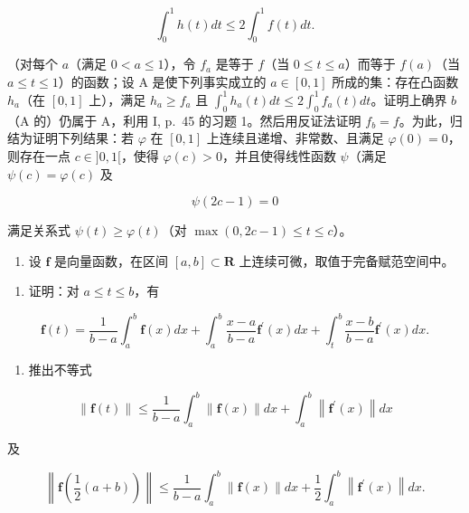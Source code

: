\[
\int_ {0} ^ {1} h (t) d t \leqslant 2 \int_ {0} ^ {1} f (t) d t.
\]

（对每个 \(a\)（满足 \(0 < a \leqslant 1\)），令 \(f_a\) 是等于 \(f\)（当 \(0 \leqslant t \leqslant a\)）而等于 \(f(a)\)（当 \(a \leqslant t \leqslant 1\)）的函数；设 A 是使下列事实成立的 \(a \in [0,1]\) 所成的集：存在凸函数 \(h_a\)（在 \([0,1]\) 上），满足 \(h_a \geqslant f_a\) 且 \(\int_0^1 h_a(t)dt \leqslant 2\int_0^1 f_a(t)dt\)。证明上确界 \(b\)（A 的）仍属于 A，利用 I, p.~45 的习题 1。然后用反证法证明 \(f_{b} = f\)。为此，归结为证明下列结果：若 \(\varphi\) 在 \([0, 1]\) 上连续且递增、非常数、且满足 \(\varphi(0) = 0\)，则存在一点 \(c \in ]0, 1[\)，使得 \(\varphi(c) > 0\)，并且使得线性函数 \(\psi\)（满足 \(\psi(c) = \varphi(c)\) 及

\[
\psi (2 c - 1) = 0
\]

满足关系式 \(\psi(t) \geqslant \varphi(t)\)（对 \(\max(0, 2c - 1) \leqslant t \leqslant c\)）。

\begin{enumerate}
\def\labelenumi{\arabic{enumi})}
\setcounter{enumi}{22}
\tightlist
\item
  设 \(\mathbf{f}\) 是向量函数，在区间 \([a, b] \subset \mathbf{R}\) 上连续可微，取值于完备赋范空间中。
\end{enumerate}

\begin{enumerate}
\def\labelenumi{\alph{enumi})}
\tightlist
\item
  证明：对 \(a \leqslant t \leqslant b\)，有
\end{enumerate}

\[
\mathbf {f} (t) = \frac {1}{b - a} \int_ {a} ^ {b} \mathbf {f} (x) d x + \int_ {a} ^ {b} \frac {x - a}{b - a} \mathbf {f} ^ {\prime} (x) d x + \int_ {t} ^ {b} \frac {x - b}{b - a} \mathbf {f} ^ {\prime} (x) d x.
\]

\begin{enumerate}
\def\labelenumi{\alph{enumi})}
\setcounter{enumi}{1}
\tightlist
\item
  推出不等式
\end{enumerate}

\[
\| \mathbf {f} (t) \| \leqslant \frac {1}{b - a} \int_ {a} ^ {b} \| \mathbf {f} (x) \| d x + \int_ {a} ^ {b} \left\| \mathbf {f} ^ {\prime} (x) \right\| d x
\]

及

\[
\left\| \mathbf {f} \left(\frac {1}{2} (a + b)\right) \right\| \leqslant \frac {1}{b - a} \int_ {a} ^ {b} \| \mathbf {f} (x) \| d x + \frac {1}{2} \int_ {a} ^ {b} \left\| \mathbf {f} ^ {\prime} (x) \right\| d x.
\]

\setcounter{exercisegroup}{1}
